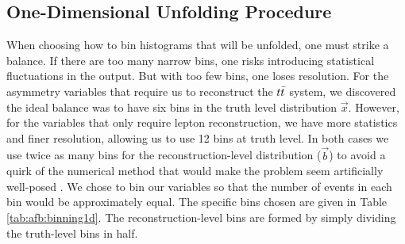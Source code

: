 \subsection{One-Dimensional Unfolding Procedure}
\label{ssec:afb:unfolding1d}

When choosing how to bin histograms that will be unfolded, one must
strike a balance. If there are too many narrow bins, one risks
introducing statistical fluctuations in the output. But
with too few bins, one loses resolution. For the asymmetry variables
that require us to reconstruct the $t\bar{t}$ system, we discovered the
ideal balance was to have six bins in the truth level distribution
$\vec{x}$. However, for the variables that only require lepton
reconstruction, we have more statistics and finer resolution, allowing
us to use 12 bins at truth level. In both cases we use twice as many
bins for the reconstruction-level distribution ($\vec{b}$) to avoid a
quirk of the numerical method that would make the problem seem
artificially well-posed \cite{blobelseminar}. We chose to bin our
variables so that the number of events in each bin would be
approximately equal. The specific bins chosen are given in Table
\ref{tab:afb:binning1d}. The reconstruction-level bins are formed by
simply dividing the truth-level bins in half.

